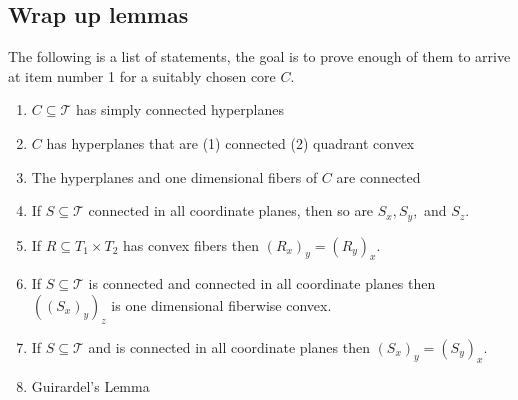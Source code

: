 \documentclass{article}
\newcommand{\sxyz}{((S_x)_y)_z}
\theoremstyle{mystyle}
\theoremstyle{remark}
\begin{document}
\subsection{Wrap up lemmas}
The following is a list of statements, the goal is to prove enough of them to arrive at item number 1 for a suitably chosen core \(C\).
\begin{enumerate}
    \item \(C \subseteq \mathscr{T}\) has simply connected hyperplanes
    \item \(C\) has hyperplanes that are (1) connected (2) quadrant convex
    \item The hyperplanes and one dimensional fibers of \(C\) are connected
    \item If \(S \subseteq \mathscr{T}\) connected in all coordinate planes, then so are \(S_{x}, S_{y},\) and \(S_{z}\).
    \item If \(R \subseteq T_{1} \times T_{2}\) has convex fibers then \( \left( R_{x} \right)_{y} = \left( R_{y} \right)_{x}\).
    \item If \(S \subseteq \mathscr{T}\) is connected and connected in all coordinate planes then \(\sxyz\) is one dimensional fiberwise convex. 
    \item \label{state:7} If \(S \subseteq \mathscr{T}\) and is connected in all coordinate planes then \( \left( S_{x} \right)_{y} = \left( S_{y} \right)_{x}\).
    \item Guirardel's Lemma
\end{enumerate}
\end{document}
